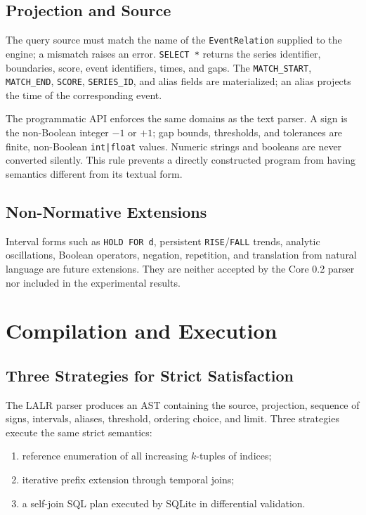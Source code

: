 \documentclass[11pt,a4paper]{article}
\newcommand{\code}[1]{\texttt{#1}}
\begin{document}
\subsection{Projection and Source}

The query source must match the name of the \code{EventRelation} supplied to the engine; a mismatch raises an error. \code{SELECT *} returns the series identifier, boundaries, score, event identifiers, times, and gaps. The \code{MATCH\_START}, \code{MATCH\_END}, \code{SCORE}, \code{SERIES\_ID}, and alias fields are materialized; an alias projects the time of the corresponding event.

The programmatic API enforces the same domains as the text parser. A sign is the non-Boolean integer $-1$ or $+1$; gap bounds, thresholds, and tolerances are finite, non-Boolean \code{int|float} values. Numeric strings and booleans are never converted silently. This rule prevents a directly constructed program from having semantics different from its textual form.

\subsection{Non-Normative Extensions}

Interval forms such as \code{HOLD FOR d}, persistent \code{RISE}/\code{FALL} trends, analytic oscillations, Boolean operators, negation, repetition, and translation from natural language are future extensions. They are neither accepted by the Core 0.2 parser nor included in the experimental results.

\section{Compilation and Execution}

\subsection{Three Strategies for Strict Satisfaction}

The LALR parser produces an AST containing the source, projection, sequence of signs, intervals, aliases, threshold, ordering choice, and limit. Three strategies execute the same strict semantics:
\begin{enumerate}
  \item reference enumeration of all increasing $k$-tuples of indices;
  \item iterative prefix extension through temporal joins;
  \item a self-join SQL plan executed by SQLite in differential validation.
\end{enumerate}
\end{document}
